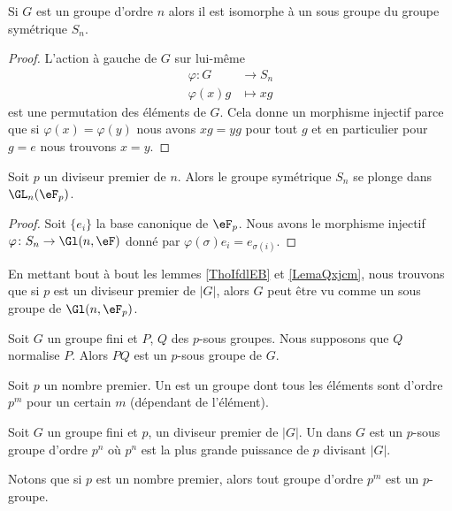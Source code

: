 \begin{lemma}    \label{ThoIfdlEB}   
    Si \( G\) est un groupe d'ordre \( n\) alors il est isomorphe à un sous groupe du groupe symétrique \( S_n\).
\end{lemma}

\begin{proof}
    L'action à gauche de \( G\) sur lui-même
    \begin{equation}
        \begin{aligned}
            \varphi\colon G&\to S_n \\
            \varphi(x)g&\mapsto xg 
        \end{aligned}
    \end{equation}
    est une permutation des éléments de \( G\). Cela donne un morphisme injectif parce que si \( \varphi(x)=\varphi(y)\) nous avons \( xg=yg\) pour tout \( g\) et en particulier pour \( g=e\) nous trouvons \( x=y\).
\end{proof}

\begin{lemma}       \label{LemaQxjcm}
    Soit \( p\) un diviseur premier de \( n\). Alors le groupe symétrique \( S_n\) se plonge dans \( \GL_n(\eF_p)\).
\end{lemma}

\begin{proof}
    Soit \( \{ e_i \}\) la base canonique de \( \eF_p\). Nous avons le morphisme injectif $\varphi\colon S_n\to \Gl(n,\eF)$ donné par \( \varphi(\sigma)e_i=e_{\sigma(i)}\).
\end{proof}
 
\begin{remark}  \label{RemFzxxst}
    En mettant bout à bout les lemmes \ref{ThoIfdlEB} et \ref{LemaQxjcm}, nous trouvons que si \( p\) est un diviseur premier de \( | G |\), alors \( G\) peut être vu comme un sous groupe de \( \Gl(n,\eF_p)\).
\end{remark}

\begin{lemma}
    Soit \( G\) un groupe fini et \( P\), \( Q\) des \( p\)-sous groupes. Nous supposons que \( Q\) normalise \( P\). Alors \( PQ\) est un \( p\)-sous groupe de \( G\).
\end{lemma}


\begin{definition}
    Soit \( p\) un nombre premier. Un  est un groupe dont tous les éléments sont d'ordre \( p^m\) pour un certain \( m\) (dépendant de l'élément).

    Soit \( G\) un groupe fini et \( p\), un diviseur premier de $| G |$. Un  dans \( G\) est un \( p\)-sous groupe d'ordre \( p^n\) où \( p^n\) est la plus grande puissance de \( p\) divisant \( | G |\).
\end{definition}
Notons que si \( p\) est un nombre premier, alors tout groupe d'ordre \( p^m\) est un \( p\)-groupe.

